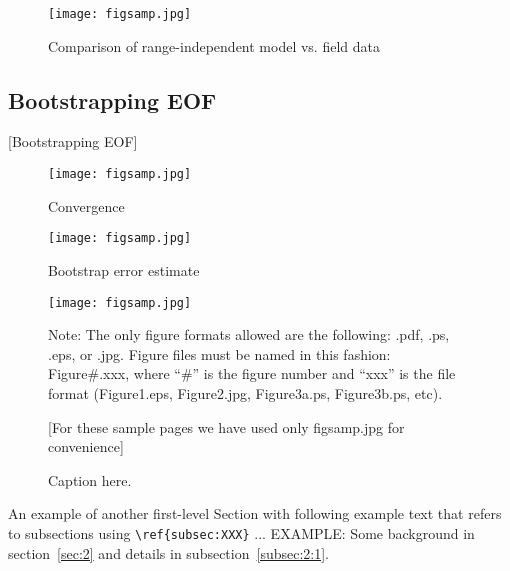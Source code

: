 \begin{figure}[ht]
\texttt{[image: figsamp.jpg]}
\caption{\label{fig:FIG5}{Comparison of range-independent model vs. field data}}
\end{figure}

\subsection{\label{subsec:4:2} Bootstrapping EOF}
{\color{red}[Bootstrapping EOF]}

\begin{figure}[ht]
\texttt{[image: figsamp.jpg]}
\caption{\label{fig:FIG6}{Convergence}}
\end{figure}

\begin{figure}[ht]
\texttt{[image: figsamp.jpg]}
\caption{\label{fig:FIG7}{Bootstrap error estimate}}
\end{figure}







\begin{figure}[ht]
\texttt{[image: figsamp.jpg]}
\caption{\label{fig:FIG1}{Caption here.}}

\raggedright
{\color{red}
Note: The only figure formats allowed are the following:
.pdf, .ps, .eps, or .jpg. Figure files must be named in this fashion:
Figure\#.xxx, where ``\#'' is the figure number and ``xxx'' is the file format
(Figure1.eps, Figure2.jpg, Figure3a.ps, Figure3b.ps, etc).
}

[For these sample pages we have used only figsamp.jpg for convenience]
\end{figure}


An example of another first-level Section with following example text that refers to subsections using
\verb+\ref{subsec:XXX}+ ...  EXAMPLE: Some background in
section~\ref{sec:2} and details  in subsection~\ref{subsec:2:1}.



